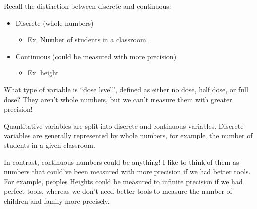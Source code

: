\documentclass[
  letterpaper,
  DIV=11,
  numbers=noendperiod]{scrreprt}
\providecommand{\tightlist}{%
  \setlength{\itemsep}{0pt}\setlength{\parskip}{0pt}}\usepackage{longtable,booktabs,array}
\begin{document}
Recall the distinction between discrete and continuous:

\begin{itemize}
\tightlist
\item
  Discrete (whole numbers)

  \begin{itemize}
  \tightlist
  \item
    Ex. Number of students in a classroom.
  \end{itemize}
\item
  Continuous (could be measured with more precision)

  \begin{itemize}
  \tightlist
  \item
    Ex. height
  \end{itemize}
\end{itemize}

\begin{tcolorbox}[enhanced jigsaw, toptitle=1mm, colbacktitle=quarto-callout-warning-color!10!white, breakable, leftrule=.75mm, left=2mm, opacityback=0, colframe=quarto-callout-warning-color-frame, rightrule=.15mm, toprule=.15mm, bottomtitle=1mm, titlerule=0mm, title=\textcolor{quarto-callout-warning-color}{\faExclamationTriangle}\hspace{0.5em}{Grey Area}, arc=.35mm, colback=white, bottomrule=.15mm, opacitybacktitle=0.6, coltitle=black]

What type of variable is ``dose level'', defined as either no dose, half
dose, or full dose? They aren't whole numbers, but we can't measure them
with greater precision!

\end{tcolorbox}

Quantitative variables are split into discrete and continuous variables.
Discrete variables are generally represented by whole numbers, for
example, the number of students in a given classroom.

In contrast, continuous numbers could be anything! I like to think of
them as numbers that could've been measured with more precision if we
had better tools. For example, peoples Heights could be measured to
infinite precision if we had perfect tools, whereas we don't need better
tools to measure the number of children and family more precisely.
\end{document}
